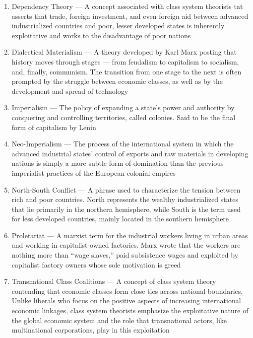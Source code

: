 \documentclass[12pt]{article}
\begin{document}
\begin{enumerate}
\begin{enumerate}
          \item Dependency Theory — A concept associated with class system theorists tat asserts that trade, foreign investment, and even foreign aid between advanced industrialized countries and poor, lesser developed states is inherently exploitative and works to the disadvantage of poor nations

          \item Dialectical Materialism — A theory developed by Karl Marx posting that history moves through stages — from feudalism to capitalism to socialism, and, finally, communism. The transition from one stage to the next is often prompted by the struggle between economic classes, as well as by the development and spread of technology

          \item Imperialism — The policy of expanding a state's power and authority by conquering and controlling territories, called colonies. Said to be the final form of capitalism by Lenin

          \item Neo-Imperialism — The process of the international system in which the advanced industrial states' control of exports and raw materials in developing nations is simply a more subtle form of domination than the previous imperialist practices of the European colonial empires

          \item North-South Conflict — A phrase used to characterize the tension between rich and poor countries. North represents the wealthy industrialized states that lie primarily in the northern hemisphere, while South is the term used for less developed countries, mainly located in the southern hemisphere

          \item Proletariat — A marxist term for the industrial workers living in urban areas and working in capitalist-owned factories. Marx wrote that the workers are nothing more than “wage slaves,” paid subsistence wages and exploited by capitalist factory owners whose sole motivation is greed

          \item Transnational Class Coalitions — A concept of class system theory contending that economic classes form close ties across national boundaries. Unlike liberals who focus on the positive aspects of increasing international economic linkages, class system theorists emphasize the exploitative nature of the global economic system and the role that transnational actors, like multinational corporations, play in this exploitation


\end{enumerate}
\end{enumerate}
\end{document}
